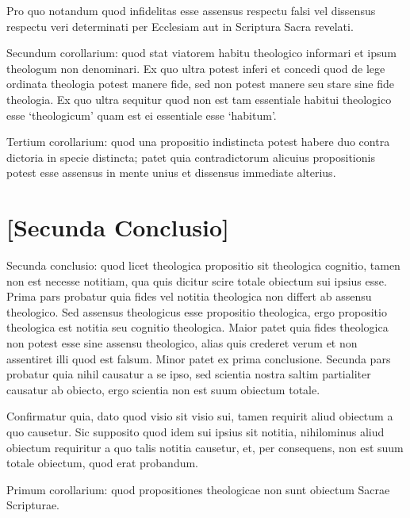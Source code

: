 \documentclass[twoside, openright]{article}
\begin{document}
        \pstart
        Pro quo notandum quod infidelitas esse assensus respectu falsi vel dissensus respectu veri determinati per Ecclesiam aut in Scriptura Sacra revelati.
        \pend
     
        \pstart
        Secundum corollarium: quod stat viatorem habitu theologico informari et ipsum theologum non denominari. Ex quo ultra potest inferi et concedi quod de lege ordinata  theologia potest manere fide, sed non potest manere seu stare sine fide theologia. Ex quo ultra sequitur quod non est tam essentiale habitui theologico esse \enquote*{theologicum} quam est ei essentiale esse \enquote*{habitum}.
        \pend
     
        \pstart
        Tertium corollarium: quod una propositio indistincta potest habere duo contra dictoria in specie distincta; patet quia contradictorum alicuius propositionis potest esse assensus in mente unius et dissensus immediate alterius.
        \pend
      
        \bigskip
         \section*{[Secunda Conclusio]} 
        \pstart
        Secunda conclusio: quod licet theologica propositio sit theologica cognitio, tamen non est necesse notitiam, qua quis dicitur scire totale obiectum sui ipsius esse. Prima pars probatur quia fides vel notitia theologica non differt ab assensu theologico. Sed assensus theologicus esse propositio theologica, ergo propositio theologica est notitia seu cognitio theologica. Maior patet quia fides theologica non potest esse sine assensu theologico, alias quis crederet verum et non assentiret illi quod est falsum. Minor patet ex prima conclusione. Secunda pars probatur quia nihil causatur a se ipso, sed scientia nostra saltim partialiter causatur ab obiecto, ergo scientia non est suum obiectum totale.
        \pend
     
        \pstart
        Confirmatur quia, dato quod visio sit visio sui, tamen requirit aliud obiectum a quo causetur. Sic supposito quod idem sui ipsius sit notitia, nihilominus aliud obiectum requiritur a quo talis notitia causetur, et, per consequens, non est suum totale obiectum, quod erat probandum.
        \pend
     
        \pstart
        Primum corollarium: quod propositiones theologicae non sunt obiectum Sacrae Scripturae.
        \pend
     
\end{document}
